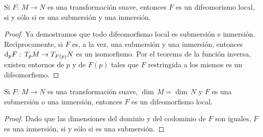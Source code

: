\begin{coroDifeoLocal}\label{thm:difeolocalsubmersioneinmersion}
	Si $F:\,M\rightarrow N$ es una transformaci\'{o}n suave, entonces
	$F$ es un difeomorismo local, si y s\'{o}lo si es una
	submersi\'{o}n y una inmersi\'{o}n.
\end{coroDifeoLocal}

\begin{proof}
	Ya demostramos que todo difeomorfismo local es submersi\'{o}n
	e inmersi\'{o}n. Rec\'{\i}procamente, si $F$ es, a la vez, una
	submersi\'{o}n y una inmersi\'{o}n, entonces
	$\diferencial[p]{F}:\,T_{p}M\rightarrow T_{F(p)}N$ es un
	isomorfismo. Por el teorema de la funci\'{o}n inversa, existen
	entornos de $p$ y de $F(p)$ tales que $F$ restringida a los mismos
	es un difeomorfismo.
\end{proof}

\begin{coroDifeoLocal}\label{thm:difeolocalsubmersionoinmersion}
	Si $F:\,M\rightarrow N$ es una transformaci\'{o}n suave,
	$\dim\,M=\dim\,N$ y $F$ es una submersi\'{o}n o una inmersi\'{o}n,
	entonces $F$ es un difeomorfismo local.
\end{coroDifeoLocal}

\begin{proof}
	Dado que las dimensiones del dominio y del codominio de $F$ son
	iguales, $F$ es una inmersi\'{o}n, si y s\'{o}lo si es una
	submersi\'{o}n.
\end{proof}
